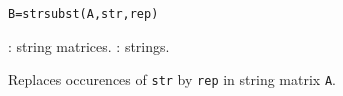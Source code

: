 
\begin{mandesc}
\end{mandesc}
\begin{calling_sequence}
\begin{verbatim}
B=strsubst(A,str,rep)
\end{verbatim}
\end{calling_sequence}

\begin{parameters}
  \begin{varlist}
    : string matrices.
    : strings.
  \end{varlist}
\end{parameters}

\begin{mandescription}
Replaces occurences of \verb+str+ by \verb+rep+ in string matrix \verb+A+.
\end{mandescription}

